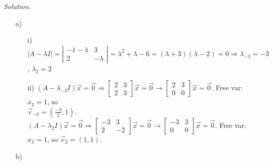 \documentclass[12pt,pdftex]{article}
\begin{document}
\begin{itemize}
\textit{Solution.}
\begin{itemize}
\item[a)] \begin{itemize}
		     \item[i)] $|A-\lambda I|=\left|\begin{matrix}
		     			-1-\lambda & 3 \\ 2 & -\lambda
		     			\end{matrix}\right|=\lambda^2+\lambda-6=(\lambda+3)(\lambda-2)=0
                        \Rightarrow \lambda_{-3}=-3$, $\lambda_2=2$
             \item[ii)] $(A-\lambda_{-3}I)\vec{x}=\vec{0} \Rightarrow 
             			\begin{bmatrix}
             			2 & 3 \\ 2 & 3
             			\end{bmatrix}\vec{x}=\vec{0} \longrightarrow 
                        \begin{bmatrix}
                        2 & 3 \\ 0 & 0
                        \end{bmatrix}\vec{x}=\vec{0}$. Free var: $x_2=1$, so \\$\vec{v}_{-3}=(\frac{-3}{2},1)$. \\
                        $(A-\lambda_2I)\vec{x}=\vec{0} \Rightarrow 
             			\begin{bmatrix}
             			-3 & 3 \\ 2 & -2
             			\end{bmatrix}\vec{x}=\vec{0} \longrightarrow 
                        \begin{bmatrix}
                        -3 & 3 \\ 0 & 0
                        \end{bmatrix}\vec{x}=\vec{0}$. Free var: $x_2=1$, so $\vec{v}_{2}=(1,1)$.
	      \end{itemize}
\item[b)] 
\end{itemize}
\end{itemize}
\end{document}

